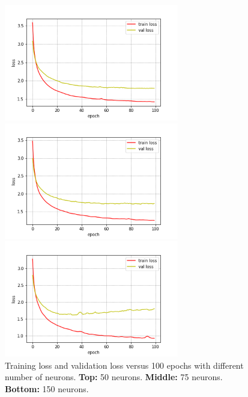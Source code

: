 \documentclass{article}
\begin{document}
\begin{figure}[H]
\begin{center}
\begin{minipage}[l]{0.5\linewidth}
  \centering
  \includegraphics[width=3in]{image/c_hidden_size_50_lstm.png}
\end{minipage}
\begin{minipage}[c]{0.5\linewidth}
  \centering
  \includegraphics[width=3in]{image/c_hidden_size_75_lstm.png}
\end{minipage}
\begin{minipage}[r]{0.5\linewidth}
  \centering
  \includegraphics[width=3in]{image/c_hidden_size_150_lstm.png}
\end{minipage}
\end{center}
\caption{Training loss and validation loss versus 100 epochs with different number of neurons. \textbf{Top:} 50 neurons. \textbf{Middle:} 75 neurons. \textbf{Bottom:} 150 neurons.}
\label{various neurons}
\end{figure}
\end{document}
